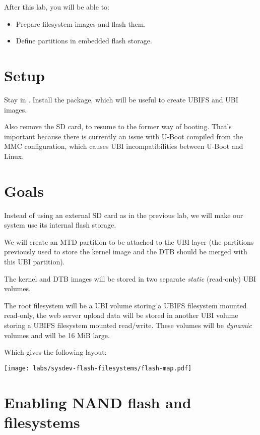 
After this lab, you will be able to:
\begin{itemize}
\item Prepare filesystem images and flash them.
\item Define partitions in embedded flash storage.
\end{itemize}

\section{Setup}

Stay in . Install the
 package, which will be useful to create UBIFS and
UBI images.

Also remove the SD card, to resume to the former way of booting.
That's important because there is currently an issue with U-Boot
compiled from the MMC configuration, which causes UBI incompatibilities
between U-Boot and Linux.

\section{Goals}

Instead of using an external SD card as in the previous lab, we will
make our system use its internal flash storage.

We will create an MTD partition to be attached to the UBI layer (the partitions
previously used to store the kernel image and the DTB should be merged
with this UBI partition).

The kernel and DTB images will be stored in two separate {\em static}
(read-only) UBI volumes.

The root filesystem will be a UBI volume storing a UBIFS filesystem
mounted read-only, the web server upload data will be stored in
another UBI volume storing a UBIFS filesystem mounted
read/write. These volumes will be {\em dynamic} volumes and will be
16 MiB large.

Which gives the following layout:

\begin{center}
  \texttt{[image: labs/sysdev-flash-filesystems/flash-map.pdf]}
\end{center}

\section{Enabling NAND flash and filesystems}

